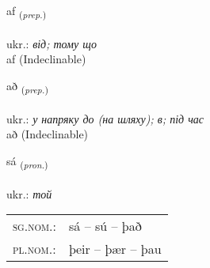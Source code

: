 \documentclass[frontgrid, backgrid]{flacards}\usepackage[]{graphicx}\usepackage[]{xcolor}
\begin{document}
{af \small{\textsubscript{(\textit{prep.})}} \\[1ex]
\textphonetic{[aːf]} \\
ukr.: \emph{від; тому що} \\  [2ex]
af (Indeclinable)}


\renewcommand{\flhead}{\vskip5pt \fboxsep=0pt {\small\bfseries\footnotesize Forsetning | прийменник}}
\renewcommand{\fcfoot}{\vskip5pt \fboxsep=0pt \hspace{2pt}{\small\bfseries\footnotesize 1K}}

\renewcommand{\blhead}{\vskip5pt {\small\bfseries\footnotesize Forsetning | прийменник }}
\renewcommand{\bcfoot}{\vskip5pt \hspace{2pt}{\small\bfseries\footnotesize 1K}}


{að \small{\textsubscript{(\textit{prep.})}} \\[1ex]
\textphonetic{[aːð]} \\
ukr.: \emph{у напряку до (на шляху); в; під час} \\  [2ex]
að (Indeclinable)}

\renewcommand{\flhead}{\vskip5pt \fboxsep=0pt {\small\bfseries\footnotesize Fornafn | займенник}}
\renewcommand{\fcfoot}{\vskip5pt \fboxsep=0pt \hspace{2pt}{\small\bfseries\footnotesize 1K}}

\renewcommand{\blhead}{\vskip5pt {\small\bfseries\footnotesize Fornafn | займенник }}
\renewcommand{\bcfoot}{\vskip5pt \hspace{2pt}{\small\bfseries\footnotesize 1K}}


{sá \small{\textsubscript{(\textit{pron.})}} \\[1ex] %
\textphonetic{[sauː]} \\
ukr.: \emph{той} \\  [2ex]
\renewcommand*{\arraystretch}{0.8}
\begin{tabular}{ll}
\textsc{sg.nom.}: & sá  --  sú -- það \\ 
\textsc{pl.nom.}: & þeir -- þær -- þau
\end{tabular}
}
\end{document}
